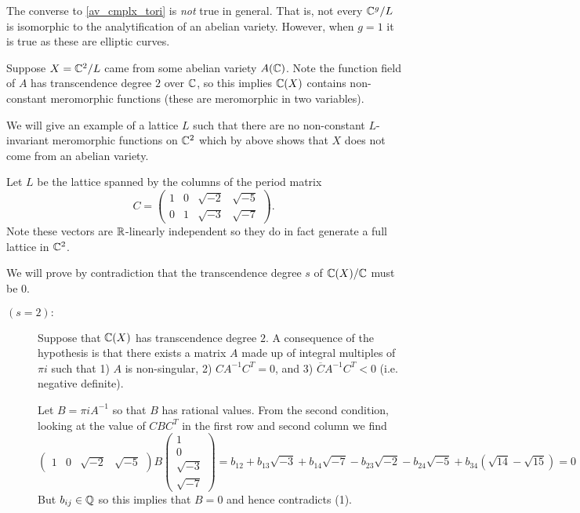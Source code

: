 \documentclass[11pt]{article}
\begin{document}
\begin{warn}
	The converse to \autoref{av_cmplx_tori} is \emph{not} true in general. That is, not every $\mathbb{C}^g/L$ is isomorphic to the analytification of an abelian variety. However, when $g=1$ it is true as these are elliptic curves.
\end{warn}

\begin{ex}
	Suppose $X = \mathbb{C}^2/L$ came from some abelian variety $A(\mathbb{C})$. Note the function field of $A$ has transcendence degree $2$ over $\mathbb{C}$, so this implies $\mathbb{C}(X)$ contains non-constant meromorphic functions (these are meromorphic in two variables).
	
	We will give an example of a lattice $L$ such that there are no non-constant $L$-invariant meromorphic functions on $\mathbb{C}^2$ which by above shows that $X$ does not come from an abelian variety.
	
	Let $L$ be the lattice spanned by the columns of the period matrix
	$$
	C = 
	\begin{pmatrix}
		1&0&\sqrt{-2}&\sqrt{-5}
		\\
		0&1&\sqrt{-3}&\sqrt{-7}
	\end{pmatrix}.	
	$$
	Note these vectors are $\mathbb{R}$-linearly independent so they do in fact generate a full lattice in $\mathbb{C}^2$.
	
	We will prove by contradiction that the transcendence degree $s$ of $\mathbb{C}(X)/\mathbb{C}$ must be $0$.
	
	\begin{description}
		\item[$(s=2):$]
			Suppose that $\mathbb{C}(X)$ has transcendence degree $2$. A consequence of the hypothesis is that there exists a matrix $A$ made up of integral multiples of $\pi i$ such that 1) $A$ is non-singular,  2) $CA^{-1}C^T = 0$, and  3) $\overline{C}A^{-1}C^T < 0$ (i.e. negative definite).
			
			Let $B = \pi i A^{-1}$ so that $B$ has rational values. From the second condition, looking at the value of $CBC^{T}$ in the first row and second column we find
			$$
			\begin{pmatrix}
				1 & 0 & \sqrt{-2} & \sqrt{-5}
			\end{pmatrix}
			B
			\begin{pmatrix}
				1 \\ 0 \\ \sqrt{-3} \\ \sqrt{-7}
			\end{pmatrix}
			=
			b_{12} + b_{13}\sqrt{-3} + b_{14}\sqrt{-7} - b_{23}\sqrt{-2} - b_{24}\sqrt{-5} + b_{34}(\sqrt{14} - \sqrt{15})
			=
			0
			$$
			But $b_{ij}\in\mathbb{Q}$ so this implies that $B = 0$ and hence contradicts (1).
		

\end{description}
\end{ex}
\end{document}
